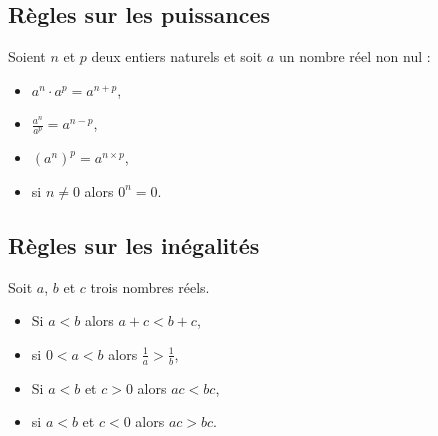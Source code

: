 	\subsection{R\`egles sur les puissances}
			Soient $n$ et $p$ deux entiers naturels et soit $a$ un nombre r\'eel non nul : \newline
			\begin{minipage}[b]{.45\actualtextwidth}
				\begin{itemize}
					\item $a^n \cdot a^p = a^{n+p}$,
					\item $\frac{a^n}{a^p} = a^{n-p}$,
				\end{itemize}
			\end{minipage}
			\begin{minipage}[b]{.45\actualtextwidth}
				\begin{itemize}
					\item $(a^n)^p = a^{n \times p}$,
						\item si $n\neq 0$ alors $0^n = 0$.
				\end{itemize}
			\end{minipage}

	\subsection{R\`egles sur les in\'egalit\'es}
		Soit $a$, $b$ et $c$ trois nombres r\'eels. \newline
			\begin{minipage}[b]{.45\actualtextwidth}
				\begin{itemize}
					\item Si $a < b$ alors $a + c < b + c$,
					\item si $0 < a < b$ alors $\frac{1}{a} > \frac{1}{b}$,
				\end{itemize}
			\end{minipage}
			\begin{minipage}[b]{.45\actualtextwidth}
				\begin{itemize}
					\item Si $ a < b $ et $c > 0$ alors $a c < b c$,
					\item si $ a < b $ et $c < 0$ alors $a c > b c$.
				\end{itemize}
			\end{minipage}































